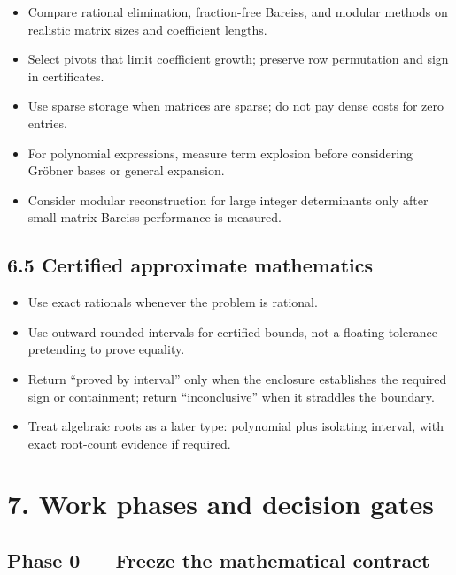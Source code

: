 \documentclass[
  10pt,
]{article}
\providecommand{\tightlist}{%
  \setlength{\itemsep}{0pt}\setlength{\parskip}{0pt}}
\begin{document}
\begin{itemize}
\tightlist
\item
  Compare rational elimination, fraction-free Bareiss, and modular
  methods on realistic matrix sizes and coefficient lengths.
\item
  Select pivots that limit coefficient growth; preserve row permutation
  and sign in certificates.
\item
  Use sparse storage when matrices are sparse; do not pay dense costs
  for zero entries.
\item
  For polynomial expressions, measure term explosion before considering
  Gröbner bases or general expansion.
\item
  Consider modular reconstruction for large integer determinants only
  after small-matrix Bareiss performance is measured.
\end{itemize}

\subsection{6.5 Certified approximate
mathematics}\label{certified-approximate-mathematics}

\begin{itemize}
\tightlist
\item
  Use exact rationals whenever the problem is rational.
\item
  Use outward-rounded intervals for certified bounds, not a floating
  tolerance pretending to prove equality.
\item
  Return ``proved by interval'' only when the enclosure establishes the
  required sign or containment; return ``inconclusive'' when it
  straddles the boundary.
\item
  Treat algebraic roots as a later type: polynomial plus isolating
  interval, with exact root-count evidence if required.
\end{itemize}

\section{7. Work phases and decision
gates}\label{work-phases-and-decision-gates}

\subsection{Phase 0 --- Freeze the mathematical
contract}\label{phase-0-freeze-the-mathematical-contract}
\end{document}
